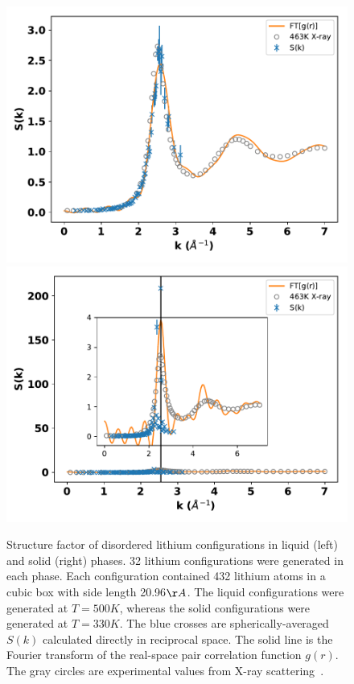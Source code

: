 \documentclass[aps,prl,superscriptaddress]{revtex4-1}
\begin{document}
\begin{figure}[h]
\includegraphics[scale=0.48]{009d_amass-cont1_t500}
\includegraphics[scale=0.48]{009d_amass-temp330}
\caption{Structure factor of disordered lithium configurations in liquid (left) and solid (right) phases. 32 lithium configurations were generated in each phase. Each configuration contained 432 lithium atoms in a cubic box with side length 20.96$\AA$. The liquid configurations were generated at $T=500K$, whereas the solid configurations were generated at $T=330K$. The blue crosses are spherically-averaged $S(k)$ calculated directly in reciprocal space. The solid line is the Fourier transform of the real-space pair correlation function $g(r)$. The gray circles are experimental values from X-ray scattering~\cite{Waseda1981,Mokshin2018}.}
\label{fig:lisk}
\end{figure}
\end{document}
